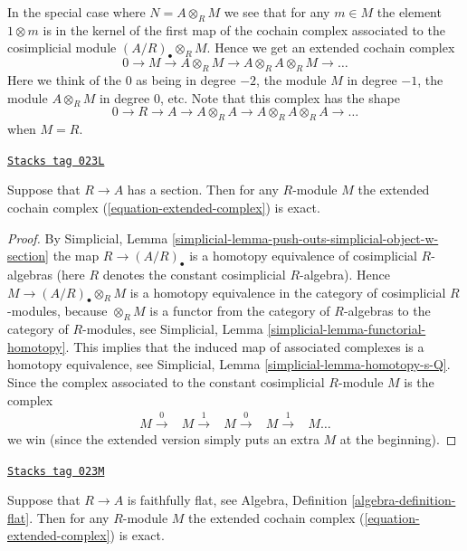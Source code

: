\medskip\noindent
In the special case
where $N = A \otimes_R M$ we see that for any $m \in M$
the element $1 \otimes m$ is in the kernel of the first map
of the cochain complex associated to the cosimplicial
module $(A/R)_\bullet \otimes_R M$. Hence we get an extended cochain complex
\begin{equation}
\label{equation-extended-complex}
0 \to M \to A \otimes_R M \to A \otimes_R A \otimes_R M \to \ldots
\end{equation}
Here we think of the $0$ as being in degree $-2$,
the module $M$ in degree $-1$, the module $A \otimes_R M$ in
degree $0$, etc. Note that this complex has the shape
$$
0 \to R \to A \to A \otimes_R A \to A \otimes_R A \otimes_R A \to \ldots
$$
when $M = R$.

\begin{lemma}
\label{descent-lemma-with-section-exact}
\href{https://stacks.math.columbia.edu/tag/023L}{\texttt{Stacks tag 023L}}

Suppose that $R \to A$ has a section.
Then for any $R$-module $M$ the extended cochain complex
(\ref{equation-extended-complex}) is exact.
\end{lemma}

\begin{proof}
By
Simplicial, Lemma \ref{simplicial-lemma-push-outs-simplicial-object-w-section}
the map $R \to (A/R)_\bullet$ is a homotopy equivalence
of cosimplicial $R$-algebras
(here $R$ denotes the constant cosimplicial $R$-algebra).
Hence $M \to (A/R)_\bullet \otimes_R M$ is
a homotopy equivalence in the category of cosimplicial
$R$-modules, because $\otimes_R M$ is a
functor from the category of $R$-algebras to the category
of $R$-modules, see
Simplicial, Lemma \ref{simplicial-lemma-functorial-homotopy}.
This implies that the induced map of associated
complexes is a homotopy equivalence, see
Simplicial, Lemma \ref{simplicial-lemma-homotopy-s-Q}.
Since the complex associated to the constant cosimplicial
$R$-module $M$ is the complex
$$
\begin{array}{ccccc}M \overset{0}{\longrightarrow} & M \overset{1}{\longrightarrow} & M \overset{0}{\longrightarrow} & M \overset{1}{\longrightarrow} & M \ldots\end{array}
$$
we win (since the extended version simply puts an extra $M$ at
the beginning).
\end{proof}

\begin{lemma}[Ff exact]
\label{descent-lemma-ff-exact}
\href{https://stacks.math.columbia.edu/tag/023M}{\texttt{Stacks tag 023M}}

Suppose that $R \to A$ is faithfully flat, see
Algebra, Definition \ref{algebra-definition-flat}.
Then for any $R$-module $M$ the extended cochain complex
(\ref{equation-extended-complex}) is exact.
\end{lemma}

